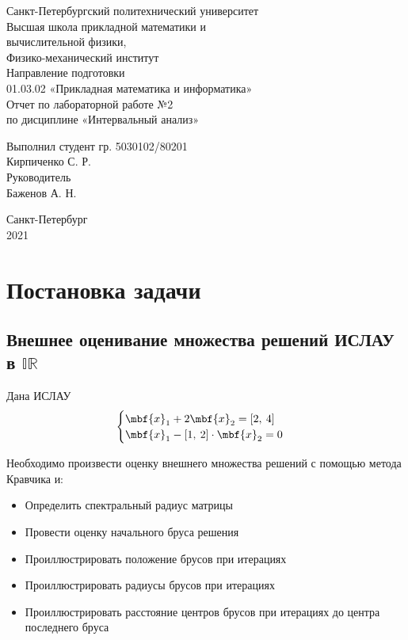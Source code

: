 \documentclass[a4paper]{article}
\begin{document}
\large
\begin{center}
    Санкт-Петербургский политехнический университет\\
    Высшая школа прикладной математики и\\вычислительной физики,\\ 
    Физико-механический институт\\
    \vspace{3em}
    Направление подготовки\\
    01.03.02 «Прикладная математика и информатика»\\
    \vspace{10em}
    \Large
    Отчет по лабораторной работе №2 \\
    по дисциплине «Интервальный анализ»
    \vspace{19em}
    \large
\end{center}
Выполнил студент гр. 5030102/80201\\
Кирпиченко С. Р.\\
Руководитель\\
Баженов А. Н.
\vspace{10em}
\begin{center}
    Санкт-Петербург\\
    2021
\end{center}
\thispagestyle{empty}
\newpage
\tableofcontents
{}
\newpage
\listoffigures
{}
\newpage
\section{Постановка задачи}
\subsection{Внешнее оценивание множества решений ИСЛАУ в $\mathbb{IR}$ }
Дана ИСЛАУ 
\begin{equation}\label{lin}
    \begin{cases}
    \mbf{x}_1+2\mbf{x}_2=[2,\:4]\\
    \mbf{x}_1 - [1,\:2]\cdot\mbf{x}_2=0
    \end{cases}
\end{equation}

Необходимо произвести оценку внешнего множества решений с помощью метода Кравчика и:
\begin{itemize}
    \item Определить спектральный радиус матрицы
    \item Провести оценку начального бруса решения
    \item Проиллюстрировать положение брусов при итерациях
    \item Проиллюстрировать радиусы брусов при итерациях
    \item Проиллюстрировать расстояние центров брусов при итерациях до центра последнего бруса
\end{itemize}
\end{document}
